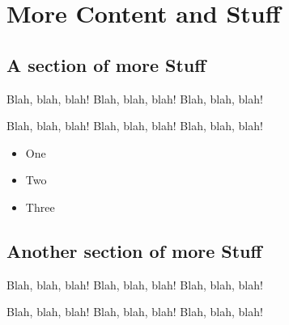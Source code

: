 \chapter{More Content and Stuff}

\section{A section of more Stuff}

Blah, blah, blah! Blah, blah, blah! Blah, blah, blah!

Blah, blah, blah! Blah, blah, blah! Blah, blah, blah!

\begin{itemize}

\item One
\item Two
\item Three

\end{itemize}

\section{Another section of more Stuff}

Blah, blah, blah! Blah, blah, blah! Blah, blah, blah!

Blah, blah, blah! Blah, blah, blah! Blah, blah, blah!
